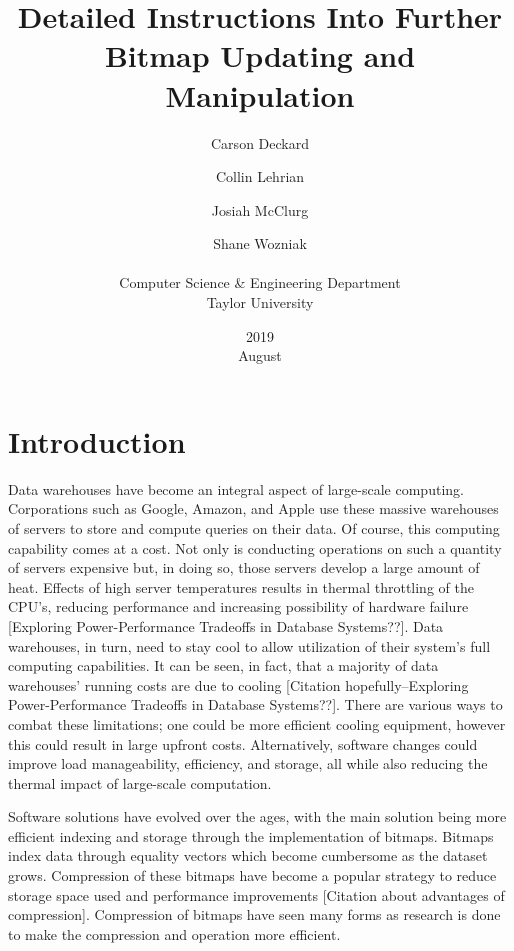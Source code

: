 \documentclass{article}
\title{Detailed Instructions Into Further Bitmap Updating and Manipulation}
\date{2019 \\ August }
\author{Carson Deckard \and Collin Lehrian \and Josiah McClurg \and Shane Wozniak \\ \\ Computer Science \&  Engineering Department \\ Taylor University}
\begin{document}
\maketitle

%
%
\section{Introduction}
\justify
Data warehouses have become an integral aspect of large-scale computing. Corporations such as Google, Amazon, and Apple use these massive warehouses of servers to store and compute queries on their data. Of course, this computing capability comes at a cost. Not only is conducting operations on such a quantity of servers expensive but, in doing so, those servers develop a large amount of heat. Effects of high server temperatures results in thermal throttling of the CPU's, reducing performance and increasing possibility of hardware failure [Exploring Power-Performance Tradeoffs in Database Systems??].
Data warehouses, in turn, need to stay cool to allow utilization of their system's full computing capabilities. It can be seen, in fact, that a majority of data warehouses' running costs are due to cooling [Citation hopefully--Exploring Power-Performance Tradeoffs in Database Systems??].
There are various ways to combat these limitations; one could be more efficient cooling equipment, however this could result in large upfront costs. Alternatively, software changes could improve load manageability, efficiency, and storage, all while also reducing the thermal impact of large-scale computation.
\par
Software solutions have evolved over the ages, with the main solution being more efficient indexing and storage through the implementation of bitmaps. Bitmaps index data through equality vectors which become cumbersome as the dataset grows.  %
Compression of these bitmaps have become a popular strategy to reduce storage space used and performance improvements [Citation about advantages of compression]. Compression of bitmaps have seen many forms as research is done to make the compression and operation more efficient. 
%
%
\end{document}
